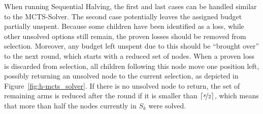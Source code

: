 \documentclass{kecsmstr}
\DeclarePairedDelimiter{\ceil}{\lceil}{\rceil}
\begin{document}
When running Sequential Halving, the first and last cases can be handled similar to the MCTS-Solver. The second case potentially leaves the assigned budget partially unspent. Because some children have been identified as a loss, while other unsolved options still remain, the proven losses should be removed from selection. Moreover, any budget left unspent due to this should be ``brought over'' to the next round, which starts with a reduced set of nodes. When a proven loss is discarded from selection, all children following this node move one position left, possibly returning an unsolved node to the current selection, as depicted in Figure~\ref{fig:h-mcts_solver}. If there is no unsolved node to return, the set of remaining arms is reduced after the round if it is smaller than $\ceil{\nicefrac{s}{2}}$, which means that more than half the nodes currently in $S_k$ were solved.
\end{document}
